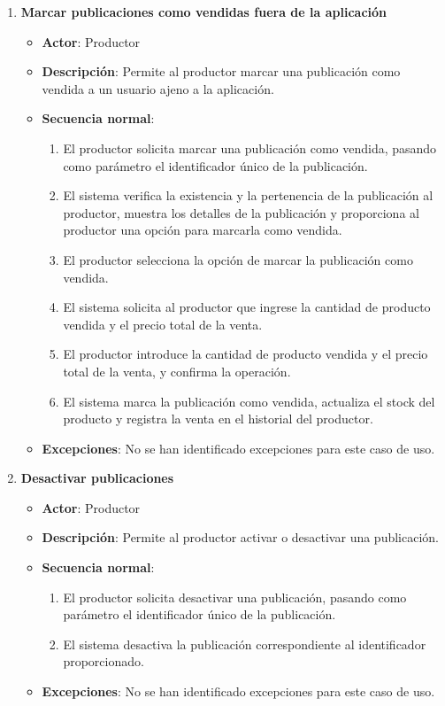 \begin{enumerate}[label=UC-\protect\twodigits{\arabic*}:, align=left, leftmargin=*]
\item \textbf{Marcar publicaciones como vendidas fuera de la aplicación}
\begin{itemize}
\item \textbf{Actor}: Productor
\item \textbf{Descripción}: Permite al productor marcar una publicación como vendida a un usuario ajeno a la aplicación.
\item \textbf{Secuencia normal}:
\begin{enumerate}[label={\arabic*}:]
\item El productor solicita marcar una publicación como vendida, pasando como parámetro el identificador único de la publicación.
\item El sistema verifica la existencia y la pertenencia de la publicación al productor, muestra los detalles de la publicación y proporciona al productor una opción para marcarla como vendida.
\item El productor selecciona la opción de marcar la publicación como vendida.
\item El sistema solicita al productor que ingrese la cantidad de producto vendida y el precio total de la venta.
\item El productor introduce la cantidad de producto vendida y el precio total de la venta, y confirma la operación.
\item El sistema marca la publicación como vendida, actualiza el stock del producto y registra la venta en el historial del productor.
\end{enumerate}
\item \textbf{Excepciones}: No se han identificado excepciones para este caso de uso.
\end{itemize}

\item \textbf{Desactivar publicaciones}
\begin{itemize}
\item \textbf{Actor}: Productor
\item \textbf{Descripción}: Permite al productor activar o desactivar una publicación.
\item \textbf{Secuencia normal}:
\begin{enumerate}[label={\arabic*}:]
\item El productor solicita desactivar una publicación, pasando como parámetro el identificador único de la publicación.
\item El sistema desactiva la publicación correspondiente al identificador proporcionado.
\end{enumerate}
\item \textbf{Excepciones}: No se han identificado excepciones para este caso de uso.
\end{itemize}


\end{enumerate}
